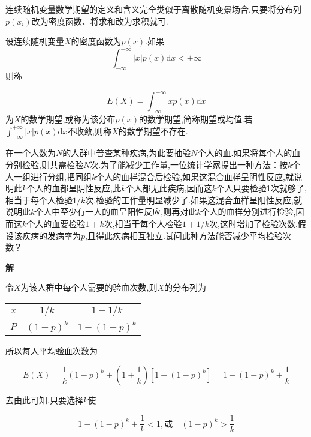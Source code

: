 连续随机变量数学期望的定义和含义完全类似于离散随机变景场合,只要将分布列$ p(x_i) $改为密度函数、将求和改为求积就可.

\begin{definition}
	设连续随机变量$ X $的密度函数为$ p(x) $.如果
	\[ 
	\int_{-\infty}^{+\infty}|x| p(x) \mathrm{d} x<+\infty
	\]
	则称
	
	\begin{equation} 
	E(X)=\int_{-\infty}^{+\infty} x p(x) \mathrm{d} x \label{eq:2.2.2}
	\end{equation}
	为$ X $的数学期望,或称为该分布$ p(x) $的数学期望,简称期望或均值.若$\int_{-\infty}^{+\infty}|x| p(x) \mathrm{d} x$不收敛,则称$ X $的数学期望不存在.
	
\end{definition}

\begin{example}
	在一个人数为$ N $的人群中普查某种疾病,为此要抽验$ N $个人的血.如果将每个人的血分别检验,则共需检验$ N $次.为了能减少工作量,一位统计学家提出一种方法：按$ k $个人一组进行分组,把同组$ k $个人的血样混合后检验,如果这混合血样呈阴性反应,就说明此$ k $个人的血都呈阴性反应,此$ k $个人都无此疾病,因而这$ k $个人只要检验1次就够了,相当于每个人检验$ 1/k $次,检验的工作量明显减少了.如果这混合血样呈阳性反应,就说明此$ k $个人中至少有一人的血呈阳性反应,则再对此$ k $个人的血样分别进行检验,因而这$ k $个人的血要检验$ 1+k $次,相当于每个人检验$ 1+1/k $次,这时增加了检验次数.假设该疾病的发病率为$ p $,且得此疾病相互独立.试问此种方法能否减少平均检验次数？
	
	\textbf{解}
	
	令$ X $为该人群中每个人需要的验血次数,则$ X $的分布列为
	
	\begin{table}[htbp]
		\centering
		\begin{tabular}{c|cc}
			$ x $	&    $ 1 / k $      &  $ 1+1 / k $ \\\midrule
			$ P $	&    $ (1-p)^{k} $  &  $ 1-(1-p)^{k} $\\
		\end{tabular}%
	\end{table}%
	
\end{example}

所以每人平均验血次数为

\[ 
E(X)=\frac{1}{k}(1-p)^{k}+\left(1+\frac{1}{k}\right)\left[1-(1-p)^{k}\right]=1-(1-p)^{k}+\frac{1}{k}
\]

去由此可知,只要选择$ k $使

\[ 
1-(1-p)^{k}+\frac{1}{k}<1, \text{或} \quad(1-p)^{k}>\frac{1}{k}
\]

